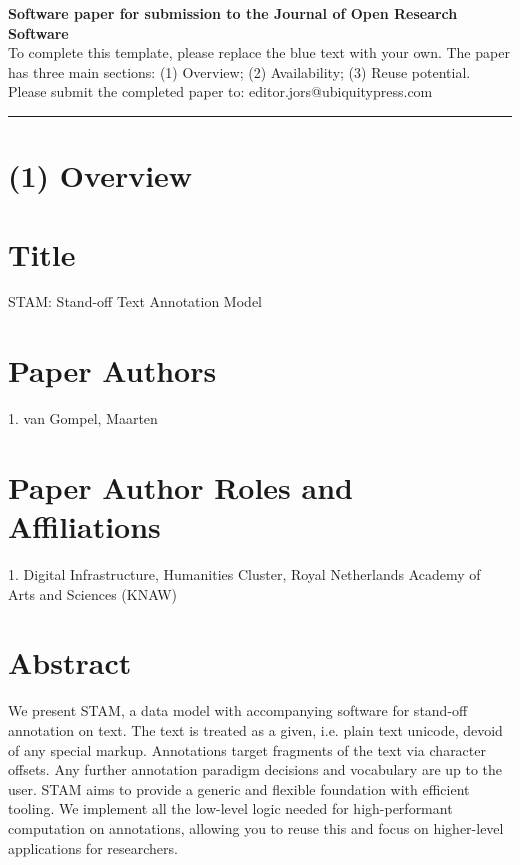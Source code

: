 \documentclass{jors}
\begin{document}
{\bf Software paper for submission to the Journal of Open Research Software} \\

To complete this template, please replace the blue text with your own. The paper has three main sections: (1) Overview; (2) Availability; (3) Reuse potential. \\

Please submit the completed paper to: editor.jors@ubiquitypress.com

\rule{\textwidth}{1pt}

\section*{(1) Overview}

\vspace{0.5cm}

\section*{Title}

STAM: Stand-off Text Annotation Model

\section*{Paper Authors}

1. van Gompel, Maarten

\section*{Paper Author Roles and Affiliations}

1. Digital Infrastructure, Humanities Cluster, Royal Netherlands Academy of Arts and Sciences (KNAW)

\section*{Abstract}

We present STAM, a data model with accompanying software for stand-off
annotation on text. The text is treated as a given, i.e. plain text unicode,
devoid of any special markup. Annotations target fragments of the text via
character offsets. Any further annotation paradigm decisions and vocabulary are
up to the user. STAM aims to provide a generic and flexible foundation
with efficient tooling. We implement all the low-level logic needed for
high-performant computation on annotations, allowing you to reuse this and
focus on higher-level applications for researchers.
\end{document}
